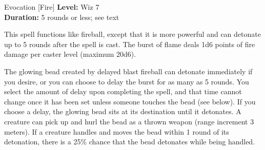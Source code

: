 {Evocation [Fire]}
{
	\textbf{Level:}
	Wiz 7\\
	\textbf{Duration:}
	5 rounds or less; see text\\
}
{
	This spell functions like fireball, except that it is more powerful and can detonate up to 5 rounds after the spell is cast. The burst of flame deals 1d6 points of fire damage per caster level (maximum 20d6).

	The glowing bead created by delayed blast fireball can detonate immediately if you desire, or you can choose to delay the burst for as many as 5 rounds. You select the amount of delay upon completing the spell, and that time cannot change once it has been set unless someone touches the bead (see below). If you choose a delay, the glowing bead sits at its destination until it detonates. A creature can pick up and hurl the bead as a thrown weapon (range increment 3 meters). If a creature handles and moves the bead within 1 round of its detonation, there is a 25\% chance that the bead detonates while being handled.

}
